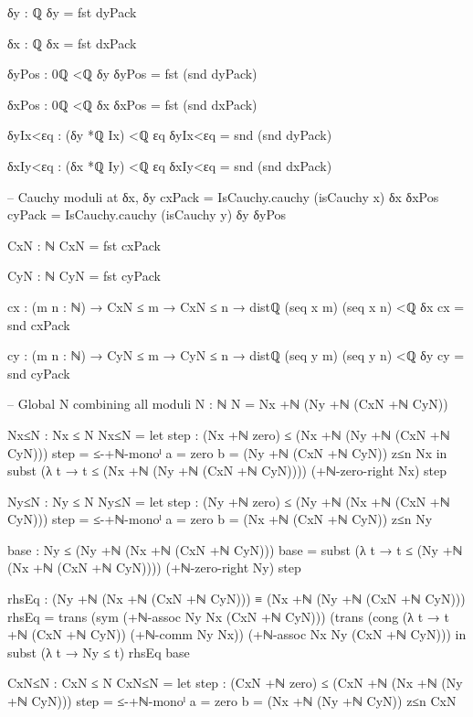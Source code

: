 \documentclass[11pt,a4paper]{book}
\begin{document}
\begin{code}
{        δy : ℚ
        δy = fst dyPack

        δx : ℚ
        δx = fst dxPack

        δyPos : 0ℚ <ℚ δy
        δyPos = fst (snd dyPack)

        δxPos : 0ℚ <ℚ δx
        δxPos = fst (snd dxPack)

        δyIx<εq : (δy *ℚ Ix) <ℚ εq
        δyIx<εq = snd (snd dyPack)

        δxIy<εq : (δx *ℚ Iy) <ℚ εq
        δxIy<εq = snd (snd dxPack)

        -- Cauchy moduli at δx, δy
        cxPack = IsCauchy.cauchy (isCauchy x) δx δxPos
        cyPack = IsCauchy.cauchy (isCauchy y) δy δyPos

        CxN : ℕ
        CxN = fst cxPack

        CyN : ℕ
        CyN = fst cyPack

        cx : (m n : ℕ) → CxN ≤ m → CxN ≤ n → distℚ (seq x m) (seq x n) <ℚ δx
        cx = snd cxPack

        cy : (m n : ℕ) → CyN ≤ m → CyN ≤ n → distℚ (seq y m) (seq y n) <ℚ δy
        cy = snd cyPack

        -- Global N combining all moduli
        N : ℕ
        N = Nx +ℕ (Ny +ℕ (CxN +ℕ CyN))

        Nx≤N : Nx ≤ N
        Nx≤N =
          let
            step : (Nx +ℕ zero) ≤ (Nx +ℕ (Ny +ℕ (CxN +ℕ CyN)))
            step = ≤-+ℕ-monoˡ {a = zero} {b = (Ny +ℕ (CxN +ℕ CyN))} z≤n Nx
          in
          subst (λ t → t ≤ (Nx +ℕ (Ny +ℕ (CxN +ℕ CyN)))) (+ℕ-zero-right Nx) step

        Ny≤N : Ny ≤ N
        Ny≤N =
          let
            step : (Ny +ℕ zero) ≤ (Ny +ℕ (Nx +ℕ (CxN +ℕ CyN)))
            step = ≤-+ℕ-monoˡ {a = zero} {b = (Nx +ℕ (CxN +ℕ CyN))} z≤n Ny

            base : Ny ≤ (Ny +ℕ (Nx +ℕ (CxN +ℕ CyN)))
            base = subst (λ t → t ≤ (Ny +ℕ (Nx +ℕ (CxN +ℕ CyN)))) (+ℕ-zero-right Ny) step

            rhsEq : (Ny +ℕ (Nx +ℕ (CxN +ℕ CyN))) ≡ (Nx +ℕ (Ny +ℕ (CxN +ℕ CyN)))
            rhsEq =
              trans
                (sym (+ℕ-assoc Ny Nx (CxN +ℕ CyN)))
                (trans
                  (cong (λ t → t +ℕ (CxN +ℕ CyN)) (+ℕ-comm Ny Nx))
                  (+ℕ-assoc Nx Ny (CxN +ℕ CyN)))
          in
          subst (λ t → Ny ≤ t) rhsEq base

        CxN≤N : CxN ≤ N
        CxN≤N =
          let
            step : (CxN +ℕ zero) ≤ (CxN +ℕ (Nx +ℕ (Ny +ℕ CyN)))
            step = ≤-+ℕ-monoˡ {a = zero} {b = (Nx +ℕ (Ny +ℕ CyN))} z≤n CxN

}
\end{code}
\end{document}
